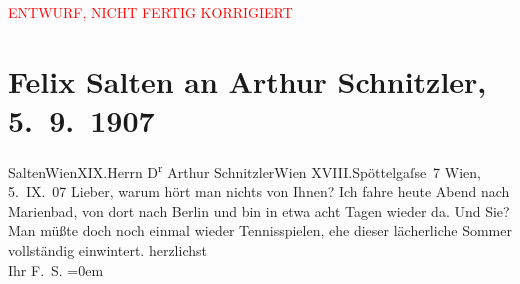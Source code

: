 
\begin{center}
            \textcolor{red}{ENTWURF, NICHT FERTIG KORRIGIERT}
                      \end{center}
            
         \renewcommand{\erwaehnteOrte}{Orte: Berlin, Edmund-Weiß-Gasse, Marienbad, Wien, XIX., Döbling, XVIII., Währing}
         \renewcommand{\erwaehnteWerke}{}
               \section[Felix Salten an Arthur Schnitzler, 5. 9. 1907]{ Felix Salten an Arthur Schnitzler, 5. 9. 1907}\nopagebreak{}\rehead{ }\begin{ledgroupsized}[t]{13cm}\normalsize\beginnumbering \toendnotes[C]{\smallbreak\pagebreak[2]} 
\pstart{}{\pb}Salten\pend{}\pstart{}Wien\pend{}\pstart{}XIX.\pend{}{\bigskip}\pstart{}Herrn D\textsuperscript{r} Arthur Schnitzler\pend{}\pstart{}Wien XVIII.\pend{}\pstart{}Spöttelgaſse 7\pend{}{\bigskip}\pstart
           \raggedleft{}{\pb}Wien, 5. IX. 07\pend
           \pstart
           Lieber, warum hört man nichts von Ihnen? Ich fahre heute Abend nach
                  Marienbad, von dort nach Berlin und bin in etwa acht Tagen wieder da. Und Sie? Man müßte
               doch noch einmal wieder Tennisspielen, ehe dieser lächerliche Sommer vollständig
               einwintert.\pend
           \pstart
           herzlichst{\\[\baselineskip]}Ihr \spacefill\mbox{F. S.}\pend
           \leftskip=0em{}
         
         \endnumbering{}\end{ledgroupsized}\begin{anhang}\end{anhang}\newcommand{\dateiname}{L03511}\newcommand{\titel}{Felix Salten an Arthur Schnitzler, 5. 9. 1907}\newcommand{\editorInnen}{Martin Anton Müller und Laura Untner}
      